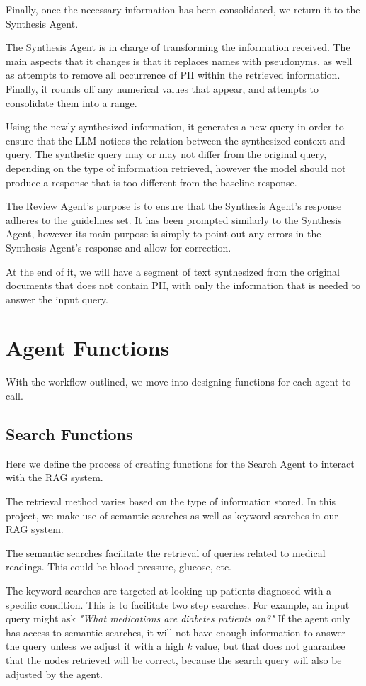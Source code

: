 Finally, once the necessary information has been consolidated, we return it to the Synthesis Agent.

The Synthesis Agent is in charge of transforming the information received. The main aspects that it changes is that it replaces names with pseudonyms, as well as attempts to remove all occurrence of PII within the retrieved information. Finally, it rounds off any numerical values that appear, and attempts to consolidate them into a range.

Using the newly synthesized information, it generates a new query in order to ensure that the LLM notices the relation between the synthesized context and query. The synthetic query may or may not differ from the original query, depending on the type of information retrieved, however the model should not produce a response that is too different from the baseline response.

The Review Agent's purpose is to ensure that the Synthesis Agent's response adheres to the guidelines set. It has been prompted similarly to the Synthesis Agent, however its main purpose is simply to point out any errors in the Synthesis Agent's response and allow for correction.

At the end of it, we will have a segment of text synthesized from the original documents that does not contain PII, with only the information that is needed to answer the input query.
\section{Agent Functions}

With the workflow outlined, we move into designing functions for each agent to call.

\subsection{Search Functions}

Here we define the process of creating functions for the Search Agent to interact with the RAG system.

The retrieval method varies based on the type of information stored. In this project, we make use of semantic searches as well as keyword searches in our RAG system.

The semantic searches facilitate the retrieval of queries related to medical readings. This could be blood pressure, glucose, etc.

The keyword searches are targeted at looking up patients diagnosed with a specific condition. This is to facilitate two step searches. For example, an input query might ask \textit{"What medications are diabetes patients on?"}
If the agent only has access to semantic searches, it will not have enough information to answer the query unless we adjust it with a high \textit{k} value, but that does not guarantee that the nodes retrieved will be correct, because the search query will also be adjusted by the agent.

